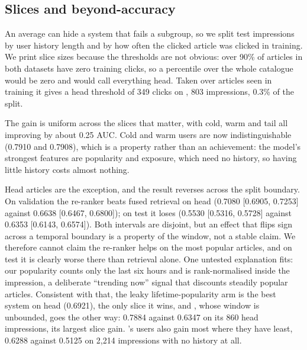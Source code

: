 \subsection{Slices and beyond-accuracy}
\label{sec:extended}

An average can hide a system that fails a subgroup, so we split test impressions by user history
length and by how often the clicked article was clicked in training. We print slice sizes because the thresholds are not obvious: over 90\% of articles in both datasets have zero
training clicks, so a percentile over the whole catalogue would be zero and would call everything
head. Taken over articles seen in training it gives a head threshold of 349 clicks on \eb{}, 803
impressions, 0.3\% of the split.

\begin{table}[t]
\centering\scriptsize

\caption{Per-impression AUC by slice, test split, with 95\% intervals. ``Gain'' is the re-ranker
minus fused retrieval. $^\ast$Lifetime popularity, not servable, shown for comparison.}
\label{tab:slices}
\end{table}

The gain is uniform across the slices that matter, with cold, warm and tail all improving by about
0.25 AUC. Cold and warm users are now indistinguishable (0.7910 and 0.7908), which is a property
rather than an achievement: the model's strongest features are popularity and
exposure, which need no history, so having little history costs almost nothing.

Head articles are the exception, and the result reverses across the split boundary. On
validation the re-ranker beats fused retrieval on head (0.7080 [0.6905, 0.7253] against 0.6638
[0.6467, 0.6800]); on test it loses (0.5530 [0.5316, 0.5728] against 0.6353 [0.6143, 0.6574]). Both
intervals are disjoint, but an effect that flips sign across a temporal boundary is a property of
the window, not a stable claim. We therefore cannot claim the re-ranker helps on the most popular articles, and on test it is
clearly worse there than retrieval alone. One untested explanation
fits: our popularity counts only the last six hours and is rank-normalised inside the impression, a
deliberate ``trending now'' signal that discounts steadily popular articles. Consistent with that,
the leaky lifetime-popularity arm is the best system on head (0.6921), the only slice it wins, and
\mind{}, whose window is unbounded, goes the other way: 0.7884 against 0.6347 on its 860 head
impressions, its largest slice gain. \mind{}'s users also gain most where they have least, 0.6288
against 0.5125 on 2,214 impressions with no history at all.

